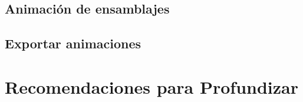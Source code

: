 \subsection{Animación de ensamblajes}

\subsection{Exportar animaciones}

\section{Recomendaciones para Profundizar}



